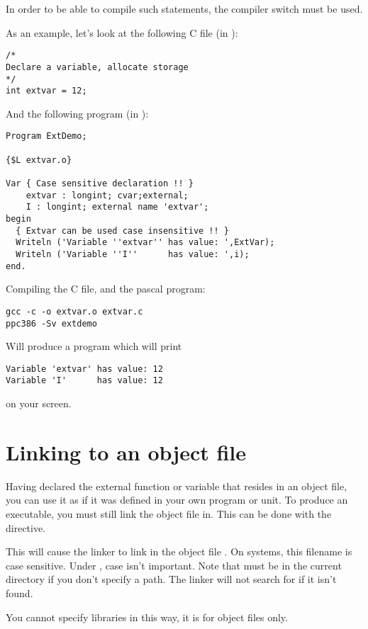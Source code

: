 In order to be able to compile such statements, the compiler switch 
must be used.

As an example, let's look at the following C file (in ):
\begin{verbatim}
/*
Declare a variable, allocate storage
*/
int extvar = 12;
\end{verbatim}
And the following program (in ):
\begin{verbatim}
Program ExtDemo;

{$L extvar.o}

Var { Case sensitive declaration !! }
    extvar : longint; cvar;external;
    I : longint; external name 'extvar';
begin
  { Extvar can be used case insensitive !! }
  Writeln ('Variable ''extvar'' has value: ',ExtVar);
  Writeln ('Variable ''I''      has value: ',i);
end.
\end{verbatim}
Compiling the C file, and the pascal program:
\begin{verbatim}
gcc -c -o extvar.o extvar.c
ppc386 -Sv extdemo
\end{verbatim}
Will produce a program  which will print
\begin{verbatim}
Variable 'extvar' has value: 12
Variable 'I'      has value: 12
\end{verbatim}
on your screen.

\section{Linking to an object file}
\label{se:LinkIn}

Having declared the external function or variable that resides in an object file,
you can use it as if it was defined in your own program or unit.
To produce an executable, you must still link the object file in.
This can be done with the  directive.

This will cause the linker to link in the object file . On
\linux systems, this filename is case sensitive. Under \dos, case isn't
important. Note that  must be in the current directory if you
don't specify a path. The linker will not search for  if it
isn't found.

You cannot specify libraries in this way, it is for object files only.

